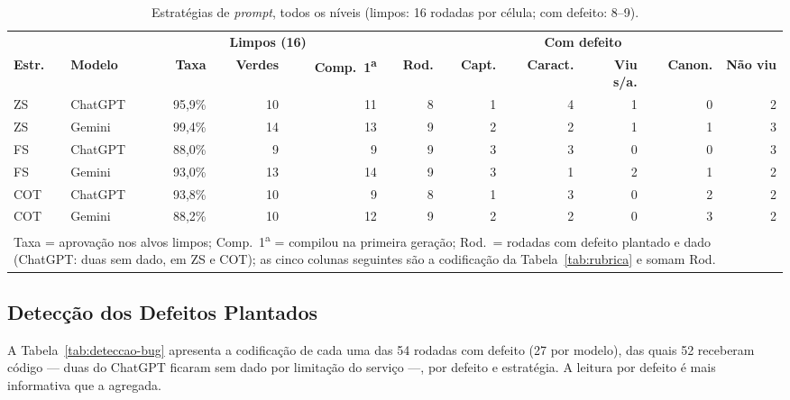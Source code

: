\documentclass[12pt]{article}
\begin{document}
\begin{table}[H]
\centering
\caption{Estratégias de \textit{prompt}, todos os níveis (limpos: 16 rodadas por célula; com defeito: 8--9).}
\label{tab:estrategias-res}
\footnotesize
\setlength{\tabcolsep}{3pt}
\begin{tabular}{llrrrrrrrrr}
\toprule
& & \multicolumn{3}{c}{\textbf{Limpos (16)}} & \multicolumn{6}{c}{\textbf{Com defeito}} \\
\cmidrule(lr){3-5}\cmidrule(lr){6-11}
\textbf{Estr.} & \textbf{Modelo} & \textbf{Taxa} & \textbf{Verdes} & \textbf{Comp.\ 1\textsuperscript{a}} & \textbf{Rod.} & \textbf{Capt.} & \textbf{Caract.} & \textbf{Viu s/a.} & \textbf{Canon.} & \textbf{Não viu} \\
\midrule
ZS  & ChatGPT & 95,9\% & 10 & 11 & 8 & 1 & 4 & 1 & 0 & 2 \\
ZS  & Gemini  & 99,4\% & 14 & 13 & 9 & 2 & 2 & 1 & 1 & 3 \\
FS  & ChatGPT & 88,0\% &  9 &  9 & 9 & 3 & 3 & 0 & 0 & 3 \\
FS  & Gemini  & 93,0\% & 13 & 14 & 9 & 3 & 1 & 2 & 1 & 2 \\
COT & ChatGPT & 93,8\% & 10 &  9 & 8 & 1 & 3 & 0 & 2 & 2 \\
COT & Gemini  & 88,2\% & 10 & 12 & 9 & 2 & 2 & 0 & 3 & 2 \\
\bottomrule
\multicolumn{11}{p{14cm}}{\footnotesize Taxa = aprovação nos alvos limpos; Comp.\ 1\textsuperscript{a} = compilou na primeira geração; Rod.\ = rodadas com defeito plantado e dado (ChatGPT: duas sem dado, em ZS e COT); as cinco colunas seguintes são a codificação da Tabela~\ref{tab:rubrica} e somam Rod.}
\end{tabular}
\end{table}

\subsection{Detecção dos Defeitos Plantados}
\label{subsec:res-deteccao}

A Tabela~\ref{tab:deteccao-bug} apresenta a codificação de cada uma das 54
rodadas com defeito (27 por modelo), das quais 52 receberam código --- duas
do ChatGPT ficaram sem dado por limitação do serviço ---, por defeito e
estratégia. A leitura por
defeito é mais informativa que a agregada.
\end{document}
